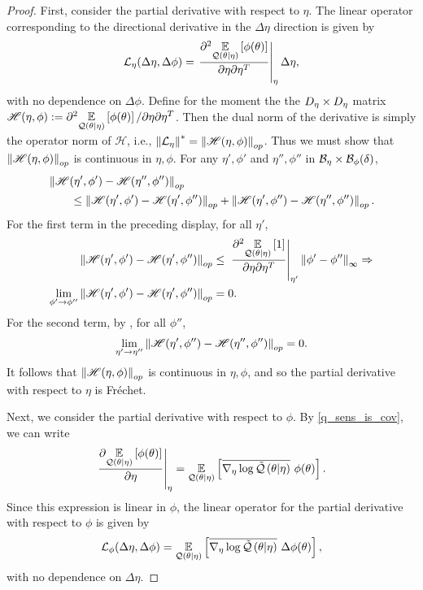 \begin{lem}
\begin{proof}
First, consider the partial derivative with respect to $\eta$.  The
linear operator corresponding to the directional derivative in the
$\Delta \eta$ direction is given by
%
\begin{align*}
%
\linop_\eta(\Delta \eta, \Delta \phi) =
    \fracat{\partial^2 \expect{\q(\theta \vert \eta)}{\phi(\theta)}}
           {\partial \eta \partial\eta^T}{\eta} \Delta \eta,
%
\end{align*}
%
with no dependence on $\Delta \phi$.  Define for the moment the the ${D_{\eta}}
\times {D_{\eta}}$ matrix $\mathscr{H}(\eta, \phi) := \partial^2 \underset{\mathcal{Q}(\theta
\vert \eta)}{\mathbb{E}}\left[\phi(\theta)\right] / \partial \eta \partial \eta^T$.  Then the dual norm
of the derivative is simply the operator norm of $\mathscr{H}$, i.e.,
$\left\Vert\mathcal{L}_\eta\right\Vert^* = \left\Vert\mathscr{H}(\eta, \phi)\right\Vert_{op}$. Thus we must show
that $\left\Vert\mathscr{H}(\eta, \phi)\right\Vert_{op}$ is continuous in $\eta, \phi$.  For
any $\eta', \phi'$ and $\eta'', \phi''$ in $\mathcal{B}_\eta \times
\mathcal{B}_\phi(\delta)$,
%
\begin{align*}
%
\MoveEqLeft
\norm{\mathscr{H}(\eta', \phi') - \mathscr{H}(\eta'', \phi'')}_{op} \\
&\le
\norm{\mathscr{H}(\eta', \phi') - \mathscr{H}(\eta', \phi'')}_{op} +
\norm{\mathscr{H}(\eta', \phi'') - \mathscr{H}(\eta'', \phi'')}_{op}.
%
\end{align*}
%
For the first term in the preceding display, for all $\eta'$,
%
\begin{align*}
%
\norm{\mathscr{H}(\eta', \phi') - \mathscr{H}(\eta', \phi'')}_{op}
    \le{}&
    \fracat{\partial^2 \expect{\q(\theta \vert \eta)}{1}}
           {\partial \eta \partial\eta^T}{\eta'} \norminf{\phi' - \phi''}
           \Rightarrow\\
\lim_{\phi' \rightarrow \phi''}
\norm{\mathscr{H}(\eta', \phi') - \mathscr{H}(\eta', \phi'')}_{op} ={}& 0.
%
\end{align*}
%
For the second term, by , for all $\phi''$,
%
\begin{align*}
%
\lim_{\eta' \rightarrow \eta''}
    \norm{\mathscr{H}(\eta', \phi'') - \mathscr{H}(\eta'', \phi'')}_{op} = 0.
%
\end{align*}
%
It follows that $\left\Vert\mathscr{H}(\eta, \phi)\right\Vert_{op}$ is continuous in $\eta,
\phi$, and so the partial derivative with respect to $\eta$ is Fr{\'e}chet.

Next, we consider the partial derivative with respect to $\phi$.  By \eqref{q_sens_is_cov}, we can write
%
\begin{align*}
%
\fracat{\partial \expect{\q(\theta \vert \eta)}{\phi(\theta)}}
       {\partial \eta}{\eta}
={}
\expect{\q(\theta \vert \eta)}
       {\lqgradbar{\theta \vert \eta} \phi(\theta)}.
%
\end{align*}
%
Since this expression is linear in $\phi$, the linear operator for the partial
derivative with respect to $\phi$ is given by
%
\begin{align*}
%
\linop_\phi(\Delta \eta, \Delta \phi) =
    \expect{\q(\theta \vert \eta)}
           {\lqgradbar{\theta \vert \eta} \Delta \phi(\theta)},
%
\end{align*}
%
with no dependence on $\Delta \eta$.


\end{proof}
\end{lem}
